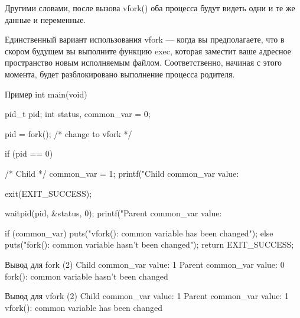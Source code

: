 Другими словами, после вызова vfork() оба процесса будут видеть одни и те же данные и переменные.

Единственный вариант использования vfork --- когда вы предполагаете, что в скором будущем вы выполните функцию exec, которая заместит ваше адресное пространство новым исполняемым файлом. Соответственно, начиная с этого момента, будет разблокировано выполнение процесса родителя.

\begin{CCode}{Пример}
	int main(void) {
		pid_t pid;
		int status, common_var = 0;
	
		pid = fork(); /* change to vfork */
	
	    if (pid == 0) {
	        /* Child  */
			common_var = 1;
			printf("Child common_var value: %
			
			exit(EXIT_SUCCESS);
		}   
		waitpid(pid, &status, 0);
		printf("Parent common_var value: %
		
		if (common_var) {
			puts("vfork(): common variable has been changed");
		} else {
			puts("fork(): common variable hasn't been changed");
		}   
		return EXIT_SUCCESS; 
	} \end{CCode}

\begin{CCode}{Вывод для fork (2)}
	Child common_var value: 1 
	Parent common_var value: 0 
	fork(): common variable hasn't been changed \end{CCode}

\begin{CCode}{Вывод для vfork (2)}
	Child common_var value: 1 
	Parent common_var value: 1 
	vfork(): common variable has been changed \end{CCode}